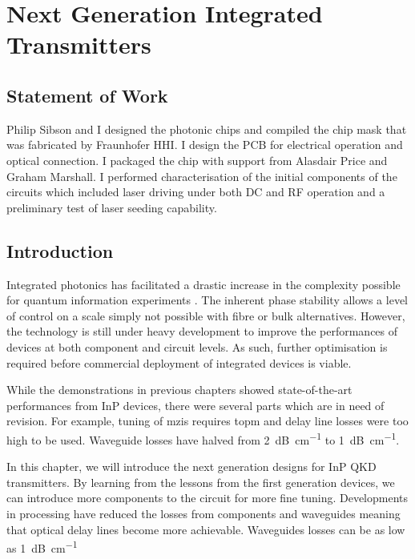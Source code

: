%
\graphicspath{{./chapters/chapter06/fig06/}}

\let\textcircled=\pgftextcircled
\chapter{Next Generation Integrated Transmitters}
\label{chap:future}

\section*{Statement of Work}

Philip Sibson and I designed the photonic chips and compiled the chip mask that was fabricated by Fraunhofer HHI. I design the PCB for electrical operation and optical connection. I packaged the chip with support from Alasdair Price and Graham Marshall. I performed characterisation of the initial components of the circuits which included laser driving under both DC and RF operation and a preliminary test of laser seeding capability.

\section{Introduction}

Integrated photonics has facilitated a drastic increase in the complexity possible for quantum information experiments \cite{wang2019integrated}. The inherent phase stability allows a level of control on a scale simply not possible with fibre or bulk alternatives. However, the technology is still under heavy development to improve the performances of devices at both component and circuit levels. As such, further optimisation is required before commercial deployment of integrated devices is viable. 

While the demonstrations in previous chapters showed state-of-the-art performances from \ac{InP} devices, there were several parts which are in need of revision. For example, tuning of \acp{mzi} requires \ac{topm} and delay line losses were too high to be used. Waveguide losses have halved from \SI{2}{dB\per\cm} to \SI{1}{dB\per\cm}.

In this chapter, we will introduce the next generation designs for \ac{InP} \ac{QKD} transmitters. By learning from the lessons from the first generation devices, we can introduce more components to the circuit for more fine tuning. Developments in processing have reduced the losses from components and waveguides meaning that optical delay lines become more achievable. Waveguides losses can be as low as \SI{1}{dB\per\cm}

